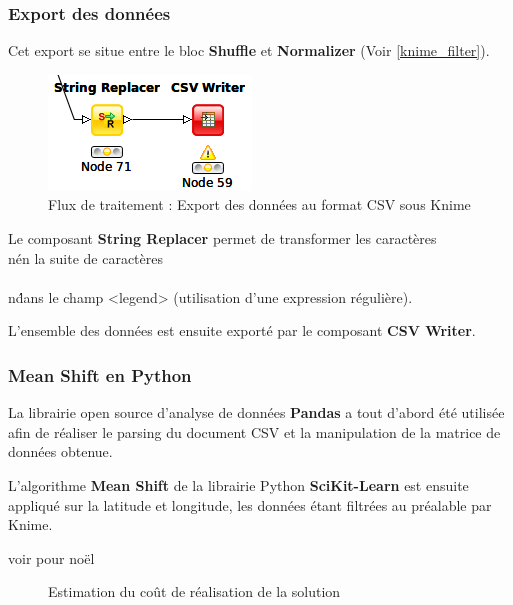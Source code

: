 \subsubsection{Export des données}
Cet export se situe entre le bloc \textbf{Shuffle} et \textbf{Normalizer} (Voir \ref{knime_filter}).

\begin{figure}[h!]
    \centering
    \includegraphics[width=\linewidth]{img/knime_csvwriter.png}
    \caption{Flux de traitement : Export des données au format CSV sous Knime}
\end{figure}

Le composant \textbf{String Replacer} permet de transformer les caractères \'\\n\' en la suite de caractères \'\\\\n\' dans le champ <legend> (utilisation d'une expression régulière).

L'ensemble des données est ensuite exporté par le composant \textbf{CSV Writer}.

\subsubsection{Mean Shift en Python}
La librairie open source d'analyse de données \textbf{Pandas} a tout d'abord été utilisée afin de réaliser le parsing du document CSV et la manipulation de la matrice de données obtenue.

L'algorithme \textbf{Mean Shift} de la librairie Python \textbf{SciKit-Learn} est ensuite appliqué sur la latitude et longitude, les données étant filtrées au préalable par Knime.




voir pour noël
\pagebreak


\begin{figure}[h!]
    \centering
    \caption{Estimation du coût de réalisation de la solution}
\end{figure}

